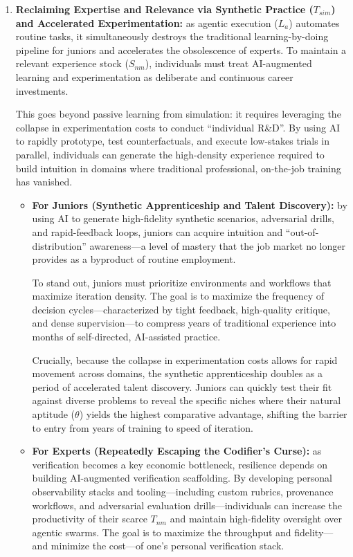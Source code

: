 \documentclass[12pt, letter]{article}
\begin{document}
\begin{enumerate}

\item \textbf{Reclaiming Expertise and Relevance via Synthetic Practice ($T_{sim}$) and Accelerated Experimentation:} as agentic execution ($L_a$) automates routine tasks, it simultaneously destroys the traditional learning-by-doing pipeline for juniors and accelerates the obsolescence of experts. To maintain a relevant experience stock ($S_{nm}$), individuals must treat AI-augmented learning and experimentation as deliberate and continuous career investments. 

This goes beyond passive learning from simulation: it requires leveraging the collapse in experimentation costs to conduct ``individual R\&D''. By using AI to rapidly prototype, test counterfactuals, and execute low-stakes trials in parallel, individuals can generate the high-density experience required to build intuition in domains where traditional professional, on-the-job training has vanished.

   \begin{itemize}
        \item \textbf{For Juniors (Synthetic Apprenticeship and Talent Discovery):} by using AI to generate high-fidelity synthetic scenarios, adversarial drills, and rapid-feedback loops, juniors can acquire intuition and ``out-of-distribution'' awareness—a level of mastery that the job market no longer provides as a byproduct of routine employment. 
        
        To stand out, juniors must prioritize environments and workflows that maximize iteration density. The goal is to maximize the frequency of decision cycles—characterized by tight feedback, high-quality critique, and dense supervision—to compress years of traditional experience into months of self-directed, AI-assisted practice.

        Crucially, because the collapse in experimentation costs allows for rapid movement across domains, the synthetic apprenticeship doubles as a period of accelerated talent discovery. Juniors can quickly test their fit against diverse problems to reveal the specific niches where their natural aptitude ($\theta$) yields the highest comparative advantage, shifting the barrier to entry from years of training to speed of iteration.
        
        \item \textbf{For Experts (Repeatedly Escaping the Codifier's Curse):} as verification becomes a key economic bottleneck, resilience depends on building AI-augmented verification scaffolding. By developing personal observability stacks and tooling—including custom rubrics, provenance workflows, and adversarial evaluation drills—individuals can increase the productivity of their scarce $T_{nm}$ and maintain high-fidelity oversight over agentic swarms. The goal is to maximize the throughput and fidelity---and minimize the cost---of one's personal verification stack.
    

\end{itemize}
\end{enumerate}
\end{document}
